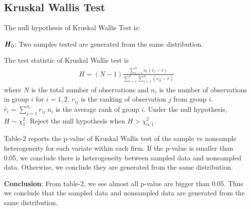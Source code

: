 \documentclass[12pt,]{article}
\begin{document}
\subsection{Kruskal Wallis Test}
The null hypothesis of Kruskal Wallis Test is:
\begin{center}
$\textbf{\textit{H}}_0$: Two samples tested are generated from the same distribution.
\end{center}
The test statistic of Kruskal Wallis test is 
\begin{align}
H = (N-1) \frac{\sum_{i = 1}^2 n_i (\bar{r}_i- \bar{r})}{\sum_{i=1}^2 \sum_{j = 1}^{n_i} (r_{ij} - \bar{r})}
\end{align}
where $N$ is the total number of observations and $n_i$ is the number of observations in group $i$ for $i = 1, 2$. $r_{ij}$ is the ranking of observation $j$ from group $i$. $\bar{r}_i = \sum_{j = 1}^{n_i} r_{ij} \ n_i$ is the average rank of group $i$. 
Under the null hypothesis, $H \sim \chi^2_1$. Reject the null hypothesis when $H > \chi^2_{\alpha, 1}$.

Table-2 reports the p-value of Kruskal Wallis test of the sample vs nonsample heterogeneity for each variate within each firm. If the p-value is smaller than 0.05, we conclude there is heterogeneity between sampled data and nonsampled data. Otherwise, we conclude they are generated from the same distribution.

\textbf{Conclusion}: From table-2, we see almost all p-value are bigger than 0.05. Thus we conclude that the sampled data and nonsampled data are generated from the same distribution.
\end{document}
